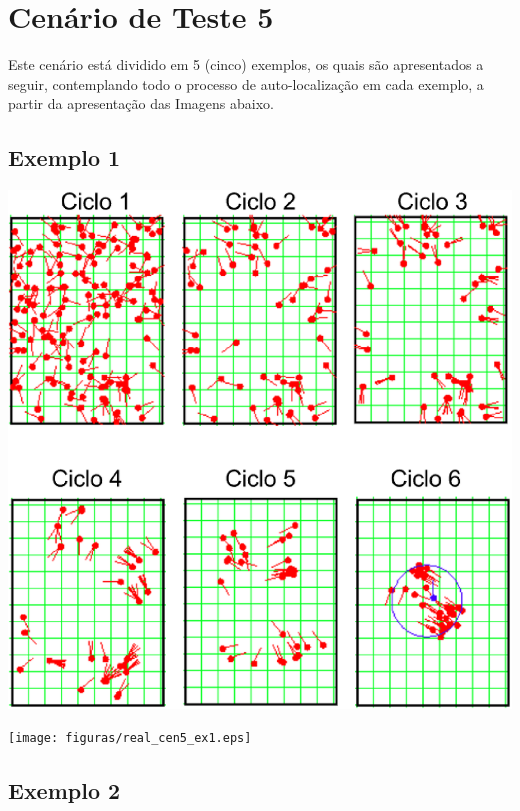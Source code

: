 \section{Cenário de Teste 5}

Este cenário está dividido em 5 (cinco) exemplos, os quais são apresentados a seguir, contemplando todo o processo de auto-localização
em cada exemplo, a partir da apresentação das Imagens abaixo.

\subsection{Exemplo 1}

{\centering
\includegraphics[scale=0.4]{figuras/cen5_ex1.eps}
\label{img:cen5_ex1}
\par}

{\centering
\texttt{[image: figuras/real\_cen5\_ex1.eps]}
\label{img:real_cen5_ex1}
\par}

\subsection{Exemplo 2}


